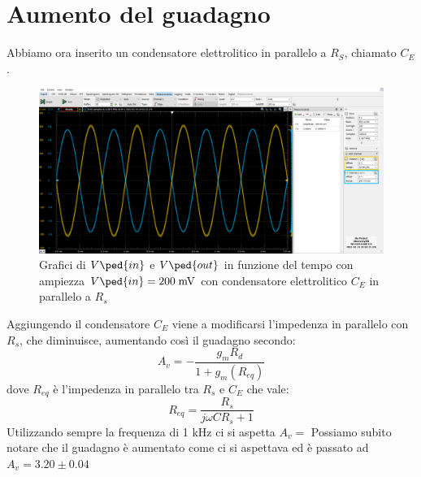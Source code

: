 \documentclass[10pt, a4paper, italian]{article}
\begin{document}
\section{Aumento del guadagno}
Abbiamo ora inserito un condensatore elettrolitico in parallelo a $R_S$, chiamato $C_E$.
\begin{figure}[htbp]
    \centering
	\includegraphics[scale=0.4]{amp.200.cap}
    \caption{Grafici di $V\ped{in}$ e $V\ped{out}$ in funzione del tempo con ampiezza $V\ped{in}=200 \; \si{m\V}$ con condensatore elettrolitico $C_E$ in parallelo a $R_s$}
\end{figure}
Aggiungendo il condensatore $C_E$ viene a modificarsi l'impedenza in parallelo con $R_s$, che diminuisce, aumentando così il guadagno secondo:
\begin{equation}
A_v = -\frac{g_m R_d}{1+g_m (R_{eq})}
\end{equation}
dove $R_{eq}$ è l'impedenza in parallelo tra $R_s$ e $C_E$ che vale:
\begin{equation}
R_{eq} = \frac{R_s}{j\omega C R_s +1}
\end{equation}
Utilizzando sempre la frequenza di 1 kHz ci si aspetta $A_v =$
Possiamo subito notare che il guadagno è aumentato come ci si aspettava ed è passato ad $A_v =3.20 \pm 0.04$
\end{document}
